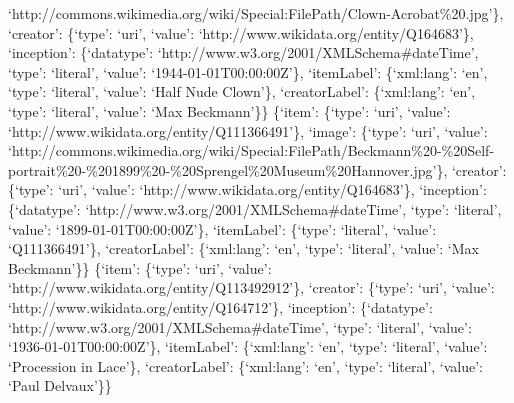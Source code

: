 \documentclass[
  letterpaper,
]{book}
\begin{document}
`http://commons.wikimedia.org/wiki/Special:FilePath/Clown-Acrobat\%20.jpg'\},
`creator': \{`type': `uri', `value':
`http://www.wikidata.org/entity/Q164683'\}, `inception': \{`datatype':
`http://www.w3.org/2001/XMLSchema\#dateTime', `type': `literal',
`value': `1944-01-01T00:00:00Z'\}, `itemLabel': \{`xml:lang': `en',
`type': `literal', `value': `Half Nude Clown'\}, `creatorLabel':
\{`xml:lang': `en', `type': `literal', `value': `Max Beckmann'\}\}
\{`item': \{`type': `uri', `value':
`http://www.wikidata.org/entity/Q111366491'\}, `image': \{`type': `uri',
`value':
`http://commons.wikimedia.org/wiki/Special:FilePath/Beckmann\%20-\%20Self-portrait\%20-\%201899\%20-\%20Sprengel\%20Museum\%20Hannover.jpg'\},
`creator': \{`type': `uri', `value':
`http://www.wikidata.org/entity/Q164683'\}, `inception': \{`datatype':
`http://www.w3.org/2001/XMLSchema\#dateTime', `type': `literal',
`value': `1899-01-01T00:00:00Z'\}, `itemLabel': \{`type': `literal',
`value': `Q111366491'\}, `creatorLabel': \{`xml:lang': `en', `type':
`literal', `value': `Max Beckmann'\}\} \{`item': \{`type': `uri',
`value': `http://www.wikidata.org/entity/Q113492912'\}, `creator':
\{`type': `uri', `value': `http://www.wikidata.org/entity/Q164712'\},
`inception': \{`datatype': `http://www.w3.org/2001/XMLSchema\#dateTime',
`type': `literal', `value': `1936-01-01T00:00:00Z'\}, `itemLabel':
\{`xml:lang': `en', `type': `literal', `value': `Procession in Lace'\},
`creatorLabel': \{`xml:lang': `en', `type': `literal', `value': `Paul
Delvaux'\}\}


\backmatter
\end{document}
